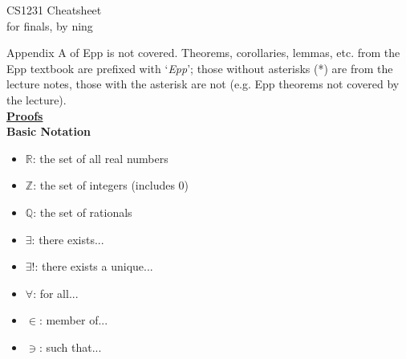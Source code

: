 \documentclass[a4paper]{article}
\newcommand{\heading}[1]{{\small\underline{\textbf{#1}}}}
\newcommand{\subheading}[1]{{\scriptsize\textbf{#1}}}
\begin{document}
\scriptsize                         %
\setlength\parindent{0pt}           %
\setlength{\abovedisplayskip}{3pt}  %
\setlength{\belowdisplayskip}{3pt}  %

\begin{center}
  {\large CS1231 Cheatsheet}\\{for finals, by ning}
\end{center}

\begin{multicols*}{4}

Appendix A of Epp is not covered. Theorems, corollaries, lemmas, etc. from the
Epp textbook are prefixed with `\textit{Epp}'; those without asterisks (*) are
from the lecture notes, those with the asterisk are not (e.g. Epp theorems not
covered by the lecture).\\

\heading{Proofs} \\

\subheading{Basic Notation}
\begin{itemize}[leftmargin=*] \itemsep -0.5em
    \item $\mathbb{R}$: the set of all real numbers
    \item $\mathbb{Z}$: the set of integers (includes $0$)
    \item $\mathbb{Q}$: the set of rationals
    \item $\exists$:    there exists...
    \item $\exists!$:   there exists a unique...
    \item $\forall$:    for all...
    \item $\in$:        member of...
    \item $\ni$:        such that...
\end{itemize}


\end{multicols*}
\end{document}
